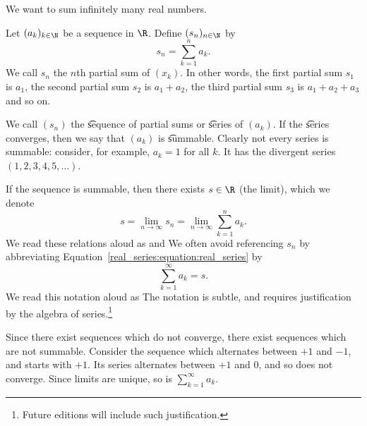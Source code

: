 

We want to sum infinitely many real numbers.


Let $(a_k)_{k \in \N}$ be a sequence in $\R$.
Define $(s_n)_{n \in \N}$ by \[s_n = \sum_{k = 1}^{n} a_k.\]
We call $s_n$ the \t{$n$th partial sum} of $(x_k)$.
In other words, the first partial sum $s_1$ is $a_1$, the second partial sum $s_2$ is $a_1 + a_2$, the third partial sum $s_3$ is $a_1 + a_2 + a_3$ and so on.

We call $(s_n)$ the \t{sequence of partial sums} or \t{series} of $(a_k)$.
If the \t{series} converges, then we say that $(a_k)$ is \t{summable}.
Clearly not every series is summable: consider, for example, $a_k = 1$ for all $k$. It has the divergent series $(1, 2, 3, 4, 5, \dots)$.



If the sequence is summable,
then there exists $s \in \R$ (the limit), which we denote
\begin{equation}
	  s = \lim_{n\to\infty} s_n = \lim_{n\to\infty} \sum_{k = 1}^{n} a_k.
	  \label{real_series:equation:real_series}
\end{equation}
We read these relations aloud as
 and
We often avoid referencing $s_n$ by abbreviating Equation~\eqref{real_series:equation:real_series} by
\[
  \sum_{k = 1}^{\infty} a_k = s.
\]
We read this notation aloud as 
The notation is subtle, and requires justification by the algebra of series.\footnote{Future editions will include such justification.}


Since there exist sequences which do not converge, there exist sequences which are not summable.
Consider the sequence which alternates between $+1$ and $-1$, and starts with $+1$.
Its series alternates between $+1$ and $0$, and so does not converge.
Since limits are unique, so is $\sum_{k=1}^{\infty}a_k$.

